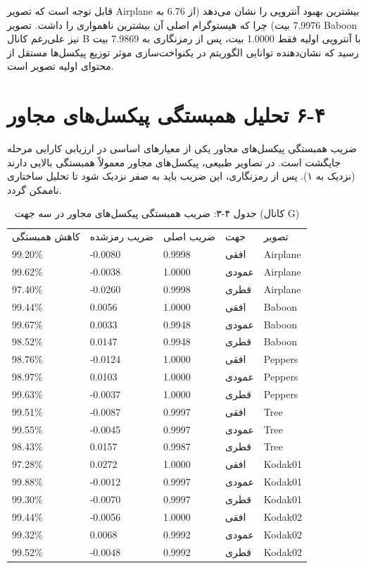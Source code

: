 قابل توجه است که تصویر Airplane بیشترین بهبود آنتروپی را نشان می‌دهد (از 6.76 به 7.9976 بیت) چرا که هیستوگرام اصلی آن بیشترین ناهمواری را داشت. تصویر Baboon نیز علی‌رغم کانال B با آنتروپی اولیه فقط 1.0000 بیت، پس از رمزنگاری به 7.9869 بیت رسید که نشان‌دهنده توانایی الگوریتم در یکنواخت‌سازی موثر توزیع پیکسل‌ها مستقل از محتوای اولیه تصویر است.

\section{‏۴‏-‏۶‏ تحلیل همبستگی پیکسل‌های مجاور}

ضریب همبستگی پیکسل‌های مجاور یکی از معیارهای اساسی در ارزیابی کارایی مرحله جایگشت است. در تصاویر طبیعی، پیکسل‌های مجاور معمولاً همبستگی بالایی دارند (نزدیک به ۱). پس از رمزنگاری، این ضریب باید به صفر نزدیک شود تا تحلیل ساختاری ناممکن گردد.

\begin{table}[h]
\centering
\small
\begin{tabular}{lllll}
\hline
کاهش همبستگی & ضریب رمزشده & ضریب اصلی & جهت & تصویر \\
99.20\% & -0.0080 & 0.9998 & افقی & Airplane \\
99.62\% & -0.0038 & 1.0000 & عمودی & Airplane \\
97.40\% & -0.0260 & 0.9998 & قطری & Airplane \\
99.44\% & 0.0056 & 1.0000 & افقی & Baboon \\
99.67\% & 0.0033 & 0.9948 & عمودی & Baboon \\
98.52\% & 0.0147 & 0.9948 & قطری & Baboon \\
98.76\% & -0.0124 & 1.0000 & افقی & Peppers \\
98.97\% & 0.0103 & 1.0000 & عمودی & Peppers \\
99.63\% & -0.0037 & 1.0000 & قطری & Peppers \\
99.51\% & -0.0087 & 0.9997 & افقی & Tree \\
99.55\% & -0.0045 & 0.9997 & عمودی & Tree \\
98.43\% & 0.0157 & 0.9987 & قطری & Tree \\
97.28\% & 0.0272 & 1.0000 & افقی & Kodak01 \\
99.88\% & -0.0012 & 0.9997 & عمودی & Kodak01 \\
99.30\% & -0.0070 & 0.9997 & قطری & Kodak01 \\
99.44\% & -0.0056 & 1.0000 & افقی & Kodak02 \\
99.32\% & 0.0068 & 0.9992 & عمودی & Kodak02 \\
99.52\% & -0.0048 & 0.9992 & قطری & Kodak02 \\
\hline
\end{tabular}
\caption{جدول ‏۴‏-‏۳‏: ضریب همبستگی پیکسل‌های مجاور در سه جهت (کانال G)}
\end{table}

